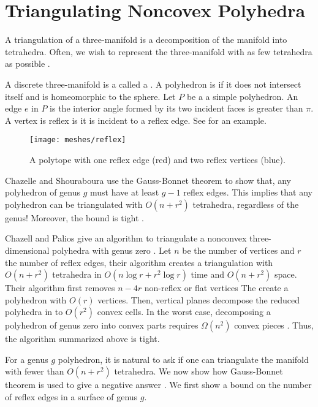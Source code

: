 \section{Triangulating Noncovex Polyhedra}
\label{sec:triangulating}

A triangulation of a three-manifold is a decomposition
of the manifold into tetrahedra.
Often, we wish to represent the three-manifold
with as few tetrahedra as possible \cite{simplify-mesh-1999}.

A discrete three-manifold is a called a . 
A polyhedron is  if it does not intersect itself and is homeomorphic to the sphere.
Let $P$ be a a simple polyhedron. An edge $e$ in $P$ is
 the interior angle formed by its two incident faces
is greater than $\pi$.
A vertex is reflex is it is incident to a reflex edge.
See  for an example.

\begin{figure}[htb]
\centering
\texttt{[image: meshes/reflex]}
\caption{A polytope with one reflex edge (red) and two reflex vertices (blue).}
\label{fig:reflex}
\end{figure}


Chazelle and Shouraboura use the 
 Gauss-Bonnet theorem to show that, any polyhedron
 of genus $g$ must have at least $g-1$ reflex edges.
 This implies that any polyhedron
can be triangulated with $O(n+r^2)$ tetrahedra, regardless  of 
the genus! Moreover, the bound is tight \cite{tetra-bounds-c-s-1994}.


Chazell and Palios give an
algorithm to triangulate a nonconvex three-dimensional polyhedra with genus
zero \cite{triangulating-polytope-1990}.
Let $n$ be the number of vertices and $r$ the number of reflex edges,
 their algorithm creates a triangulation with $O(n+r^2)$ tetrahedra 
in $O(n\log r +r^2\log r)$ time and $O(n+r^2)$ space.
Their algorithm first removes $n-4r$ non-reflex or flat vertices
The create a polyhedron with $O(r)$ vertices.
Then, vertical planes decompose the reduced polyhedra in to
$O(r^2)$ convex cells.
In the worst case, decomposing a polyhedron of genus
zero into convex parts requires $\Omega(n^2)$ convex pieces
\cite{chazelle-lower-1984}.
Thus, the algorithm summarized above is tight.


For a genus $g$ polyhedron, it is natural to ask if one can 
triangulate the manifold with fewer than $O(n+r^2)$ tetrahedra.
We now show how Gauss-Bonnet theorem is used to give a negative answer 
 \cite{tetra-bounds-c-s-1994}.
We first show a bound on the number of reflex edges
in a surface of genus $g$.


